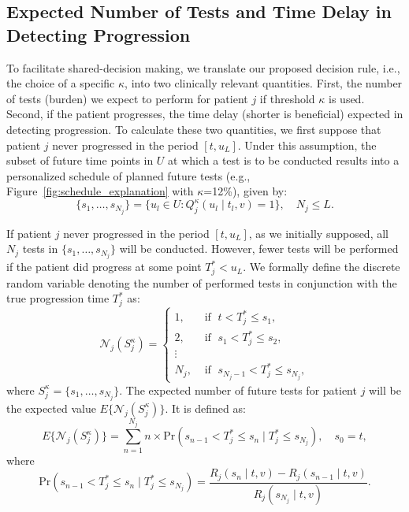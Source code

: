 \subsection{Expected Number of Tests and Time Delay in Detecting Progression}
\label{subsec:exp_delay_estimation}
To facilitate shared-decision making, we translate our proposed decision rule, i.e., the choice of a specific $\kappa$, into two clinically relevant quantities. First, the number of tests (burden) we expect to perform for patient $j$ if threshold $\kappa$ is used. Second, if the patient progresses, the time delay (shorter is beneficial) expected in detecting progression. To calculate these two quantities, we first suppose that patient $j$ never progressed in the period $[t, u_L]$. Under this assumption, the subset of future time points in $U$ at which a test is to be conducted results into a personalized schedule of planned future tests (e.g., Figure~\ref{fig:schedule_explanation} with $\kappa$=12\%), given by:
\begin{equation}
\label{eq:personalized_schedule_grid}
\{s_1, \ldots, s_{N_j}\} = \big\{ u_l \in U : Q_j^\kappa(u_l \mid t_l, v) = 1 \big\}, \quad N_j \leq L.
\end{equation}

If patient $j$ never progressed in the period $[t, u_L]$, as we initially supposed, all $N_j$ tests in $\{s_1, \ldots, s_{N_j}\}$ will be conducted. However, fewer tests will be performed if the patient did progress at some point $T_j^* < u_L$. We formally define the discrete random variable denoting the number of performed tests in conjunction with the true progression time $T_j^*$ as:
\[
\mathcal N_j (S^\kappa_j) = \left \{
\begin{array}{ll}
1, & \mbox{ if } \; t < T^*_j \leq s_1,\\
2, & \mbox{ if } \; s_1 < T^*_j \leq s_2,\\
\vdots&\\
N_j, & \mbox{ if } \; s_{N_j-1} < T^*_j \leq s_{N_j},
\end{array}
\right.
\]
where $S^\kappa_j = \{s_1, \ldots, s_{N_j}\}$. The expected number of future tests for patient $j$ will be the expected value $E \big \{\mathcal N_j(S^\kappa_j)\big\}$. It is defined as:
\begin{equation*}
\label{eq:exp_tests}
E \big \{\mathcal N_j(S^\kappa_j)\big\} = \sum_{n = 1}^{N_j} n \times \mbox{Pr}(s_{n-1} < T^*_j \leq s_n \mid T^*_j \leq s_{N_j}), \quad s_0 = t,
\end{equation*}
where 
\begin{equation*}
\mbox{Pr}(s_{n-1} < T^*_j \leq s_n \mid T^*_j \leq s_{N_j}) = \frac{R_j(s_n \mid t, v) - R_j(s_{n-1} \mid t, v)}{R_j(s_{N_j} \mid t, v)}.
\end{equation*}

